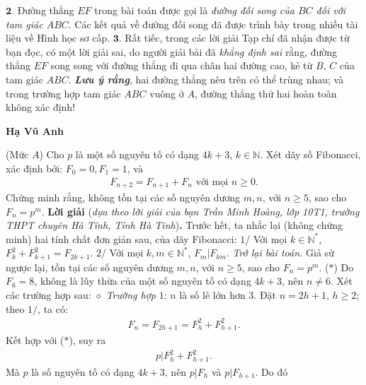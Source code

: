 \begin{multicols}{2}
	\vskip 0.05cm
	$\pmb{2.}$ Đường thẳng $EF$ trong bài toán được gọi là \textit{đường đối song của $BC$ đối với tam giác $ABC$}. Các kết quả về đường đối song đã được trình bày trong nhiều tài liệu về Hình học sơ cấp.
	\vskip 0.05cm
	$\pmb{3.}$ Rất tiếc, trong các lời giải Tạp chí đã nhận được từ bạn đọc, có một lời giải sai, do người giải bài đã \textit{khẳng định sai} rằng, đường thẳng $EF$ song song với đường thẳng đi qua chân hai đường cao, kẻ từ $B$, $C$ của tam giác $ABC$.
	\vskip 0.05cm
	\textbf{\color{thachthuctoanhoc}\textit{Lưu ý rằng}}, hai đường thẳng nêu trên có thể trùng nhau; và trong trường hợp tam giác $ABC$ vuông ở $A$, đường thẳng thứ hai hoàn toàn không xác định!
	\begin{flushright}
		\textbf{\color{thachthuctoanhoc}Hạ Vũ Anh}
	\end{flushright}
	{}
	(Mức $A$)
	Cho $p$ là một số nguyên tố có dạng $4k + 3$, $k \in \mathbb{N}$. Xét dãy số Fibonacci, xác định bởi: $F_0 = 0, F_1 = 1$,    và
	\begin{align*}
		 {F_{n + 2}} = {F_{n + 1}} + {F_n}	\text{ với mọi } n \ge 0.
	\end{align*}
	Chứng minh rằng, không tồn tại các số nguyên dương $m, n$, với $n \ge 5$, sao cho $F_n = p^m$.
	\textbf{\color{thachthuctoanhoc}Lời giải} (\textit{dựa theo lời giải của bạn Trần Minh Hoàng, lớp 10T1, trường THPT chuyên Hà Tĩnh, Tỉnh Hà Tĩnh})\textbf{\color{thachthuctoanhoc}.}
	\vskip 0.05cm
	Trước hết, ta nhắc lại (không chứng minh) hai tính chất đơn giản sau, của dãy Fibonacci:
	\vskip 0.05cm
	$1/$ Với mọi  $k \in \mathbb{N^*}$, $F_k^2 + F_{k + 1}^2 = {F_{2k + 1}}.$
	\vskip 0.05cm
	$2/$ Với mọi $k, m \in \mathbb{N^*}$, ${F_m}|{F_{km}}.$
	\vskip 0.05cm
	\textit{Trở lại bài toán.}
	\vskip 0.05cm
	Giả sử ngược lại, tồn tại các số nguyên dương $m, n$, với $n \ge 5$, sao cho  $F_n = p^m$. \hfill ($*$)
	\vskip 0.05cm
	Do $F_6 = 8$, không là lũy thừa của một số nguyên tố có dạng $4k + 3$, nên $n \ne 6$.
	\vskip 0.05cm
	Xét các trường hợp sau:
	\vskip 0.05cm
	$\diamond$ \textit{Trường hợp} $1$: $n$ là số lẻ lớn hơn $3$.
	\vskip 0.05cm
	Đặt $n = 2h + 1$, $h \ge 2$; theo $1/$, ta có:
	\begin{align*}
		{F_n} = {F_{2h + 1}} = F_h^2 + F_{h + 1}^2.
	\end{align*}
	Kết hợp với ($*$), suy ra
	\begin{align*}
		p|F_h^2 + F_{h + 1}^2.
	\end{align*}
	Mà $p$ là số nguyên tố có dạng $4k + 3$, nên $p|{F_h}$ và $p|{F_{h + 1}}$.  Do đó

\end{multicols}
